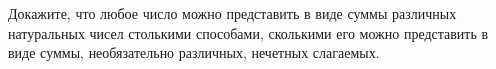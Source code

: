 Докажите, что любое число можно представить в виде суммы различных натуральных чисел столькими способами,
сколькими его можно представить в виде суммы, необязательно различных, нечетных слагаемых.
